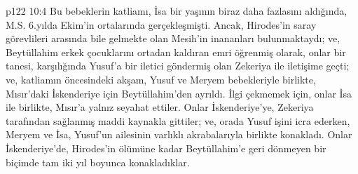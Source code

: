 \vs p122 10:4 Bu bebeklerin katliamı, İsa bir yaşının biraz daha fazlasını aldığında, M.S. 6.yılda Ekim’in ortalarında gerçekleşmişti. Ancak, Hirodes’in saray görevlileri arasında bile gelmekte olan Mesih’in inananları bulunmaktaydı; ve, Beytüllahim erkek çocuklarını ortadan kaldıran emri öğrenmiş olarak, onlar bir tanesi, karşılığında Yusuf’a bir iletici göndermiş olan Zekeriya ile iletişime geçti; ve, katliamın öncesindeki akşam, Yusuf ve Meryem bebekleriyle birlikte, Mısır’daki İskenderiye için Beytüllahim’den ayrıldı. İlgi çekmemek için, onlar İsa ile birlikte, Mısır’a yalnız seyahat ettiler. Onlar İskenderiye’ye, Zekeriya tarafından sağlanmış maddi kaynakla gittiler; ve, orada Yusuf işini icra ederken, Meryem ve İsa, Yusuf’un ailesinin varlıklı akrabalarıyla birlikte konakladı. Onlar İskenderiye’de, Hirodes’in ölümüne kadar Beytüllahim’e geri dönmeyen bir biçimde tam iki yıl boyunca konakladıklar.
